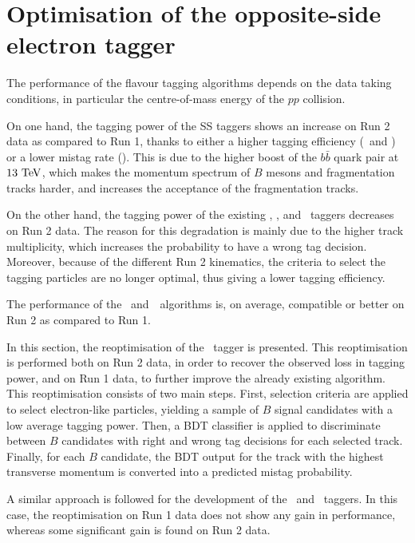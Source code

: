 \section{Optimisation of the opposite-side electron tagger}
\label{sec:tagging:OSeOpt}


The performance of the flavour tagging algorithms depends on the data taking conditions, in particular the centre-of-mass energy
of the $pp$ collision. 

On one hand, the tagging power of the SS taggers shows an increase on Run 2 data as compared to Run 1, thanks to either a higher tagging efficiency (\SSpi~and \SSp) or a lower mistag rate (\SSK). This is due to the higher boost of the $b\bar b$ quark pair at $13~\rm TeV$, which makes the momentum spectrum of $B$ mesons and fragmentation tracks harder, and increases the acceptance of the fragmentation tracks. 

On the other hand, the tagging power of the existing \OSe, \OSmu, and \OSK~taggers decreases on Run 2 data. The reason for this degradation is mainly due to the higher track multiplicity, which increases the probability to have a wrong tag decision. Moreover, because of the different Run 2 kinematics, the criteria to select the tagging particles are no longer optimal, thus giving a lower tagging efficiency.

The performance of the \OSc~and~\OSvtx~algorithms is, on average, compatible or better on Run 2 as compared to Run 1.

In this section, the reoptimisation of the \OSe~tagger is presented. This reoptimisation is performed both on Run 2 data, in order to recover the observed loss in tagging power, and on Run 1 data, to further improve the already existing algorithm.
This reoptimisation consists of two main steps. First, selection criteria are applied to select electron-like particles, yielding a sample of $B$ signal candidates with a low average tagging power. Then, a BDT classifier is applied to discriminate between $B$ candidates with right and wrong tag decisions for each selected track. Finally, for each $B$ candidate, the BDT output for the track with the highest transverse momentum is converted into a predicted mistag probability. 

A similar approach is followed for the development of the \OSK~and \OSmu~taggers. In this case, the reoptimisation on Run 1 data does not show any gain in performance, whereas some significant gain is found on Run 2 data.

